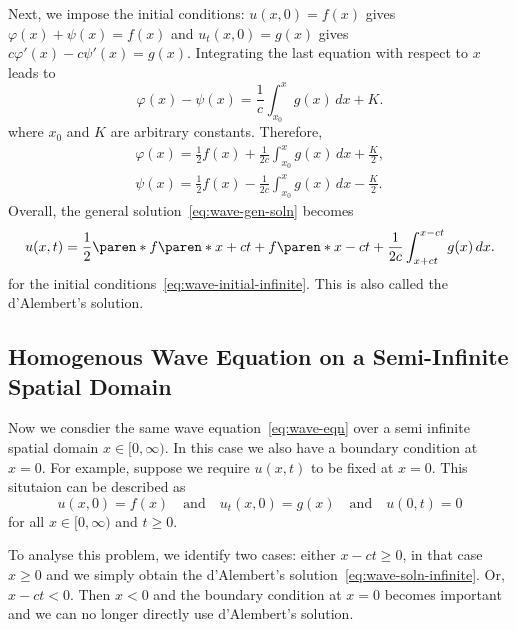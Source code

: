 \documentclass[11pt]{penrose}
\begin{document}
Next, we impose the initial conditions: $u(x, 0) = f(x)$ gives $\varphi(x) + \psi(x) = f(x)$ and $u_t (x, 0) = g(x)$ gives $c\varphi'(x) - c\psi'(x) = g(x)$. Integrating the last equation with respect to $x$ leads to
 \begin{equation}
    \varphi(x) - \psi(x) = \frac{1}{c} \int_{x_0}^{x} g(x) \,dx + K.
\end{equation}
where $x_0$ and $K$ are arbitrary constants. Therefore,
\begin{gather}
    \varphi(x) = \frac{1}{2} f(x) + \frac{1}{2c} \int_{x_0}^{x} g(x) \,dx + \frac{K}{2}, \label{eq:wave-phi}\\
    \psi(x) = \frac{1}{2} f(x) - \frac{1}{2c} \int_{x_0}^{x} g(x) \,dx - \frac{K}{2} \label{eq:wave-psi}.
\end{gather}
Overall, the general solution~\eqref{eq:wave-gen-soln} becomes
\begin{equation}
    u(x, t)
    = \frac{1}{2} \paren*{f\paren*{x + ct} + f\paren*{x - ct}}
    + \frac{1}{2c} \int_{x + ct}^{x - ct} g(x) \,dx.
    \label{eq:wave-soln-infinite}
\end{equation}
for the initial conditions~\eqref{eq:wave-initial-infinite}. This is also called the d'Alembert's solution.

\subsection{Homogenous Wave Equation on a Semi-Infinite Spatial Domain}
Now we consdier the same wave equation~\eqref{eq:wave-eqn} over a semi infinite spatial domain $x \in [0, \infty)$. In this case we also have a boundary condition at $x=0$. For example, suppose we require $u(x,t)$ to be fixed at $x=0$. This situtaion can be described as
\begin{equation}
    u(x, 0) = f(x)
    \quad\text{and}\quad
    u_t (x, 0) = g(x)
    \quad\text{and}\quad
    u(0, t) = 0
    \label{eq:wave-initial-semiinfinite}
\end{equation}
for all $x \in [0, \infty)$ and $t \geq 0$.

To analyse this problem, we identify two cases: either $x - ct \geq 0$, in that case $x \geq 0$ and we simply obtain the d'Alembert's solution~\eqref{eq:wave-soln-infinite}. Or, $x - ct < 0$. Then $x < 0$ and the boundary condition at $x = 0$ becomes important and we can no longer directly use d'Alembert's solution.
\end{document}
